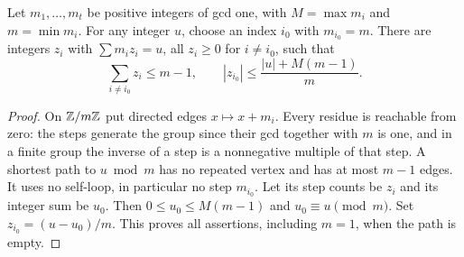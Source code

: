 \begin{lemma}\label{transverse:lem:correction}
Let $m_1,\ldots,m_t$ be positive integers of gcd one, with $M=\max m_i$ and $m=\min m_i$. For any integer $u$, choose an index $i_0$ with $m_{i_0}=m$. There are integers $z_i$ with $\sum m_i z_i=u$, all $z_i\ge0$ for $i\ne i_0$, such that
\[
 \sum_{i\ne i_0}z_i\le m-1,
 \qquad
 |z_{i_0}|\le\frac{|u|+M(m-1)}{m}.
\]
\end{lemma}
\begin{proof}
On $\mathbb Z/m\mathbb Z$ put directed edges $x\mapsto x+m_i$. Every residue is reachable from zero: the steps generate the group since their gcd together with $m$ is one, and in a finite group the inverse of a step is a nonnegative multiple of that step. A shortest path to $u\bmod m$ has no repeated vertex and has at most $m-1$ edges. It uses no self-loop, in particular no step $m_{i_0}$. Let its step counts be $z_i$ and its integer sum be $u_0$. Then $0\le u_0\le M(m-1)$ and $u_0\equiv u\pmod m$. Set $z_{i_0}=(u-u_0)/m$. This proves all assertions, including $m=1$, when the path is empty.
\end{proof}

